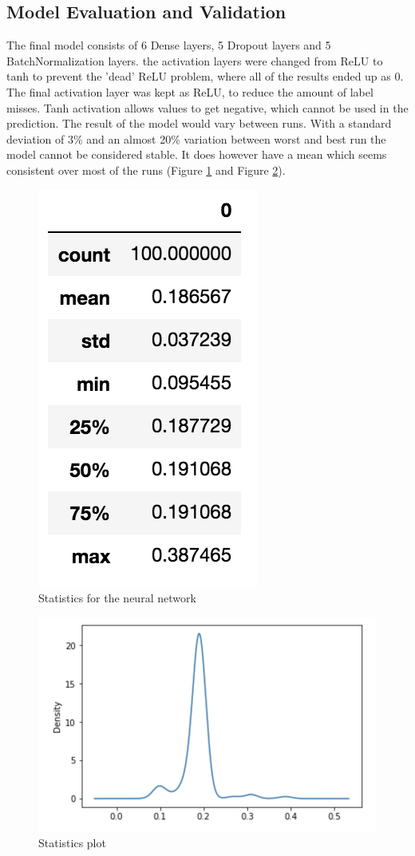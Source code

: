 \documentclass[preprint,12pt]{elsarticle}
\begin{document}
\subsection{Model Evaluation and Validation}

The final model consists of 6 Dense layers, 5 Dropout layers and 5 BatchNormalization layers. the activation layers were changed from ReLU to tanh to prevent the 'dead' ReLU problem, where all of the results ended up as 0. The final activation layer was kept as ReLU, to reduce the amount of label misses. Tanh activation allows values to get negative, which cannot be used in the prediction. The result of the model would vary between runs. With a standard deviation of 3\% and an almost 20\% variation between worst and best run the model cannot be considered stable. It does however have a mean which seems consistent over most of the runs (Figure \ref{fig:dnn_f1_comparison} and Figure \ref{fig:dnn_f1_comparison_plot}).

\begin{figure}[!h]
\centering\includegraphics[width=0.3\linewidth]{dnn_f1_comparison}
\caption{Statistics for the neural network}
\label{fig:dnn_f1_comparison}
\end{figure}

\begin{figure}[!h]
\centering\includegraphics[width=0.8\linewidth]{dnn_f1_comparison_plot}
\caption{Statistics plot}
\label{fig:dnn_f1_comparison_plot}
\end{figure}
\end{document}
